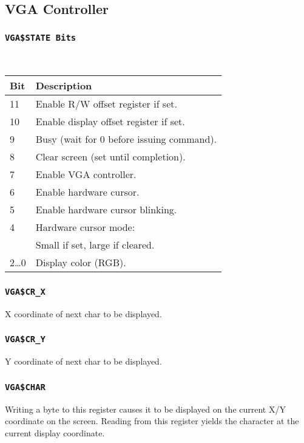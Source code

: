 \documentclass{leaflet}
\begin{document}
  \subsection{VGA Controller}
   \subsubsection{\texttt{VGA\$STATE Bits}}
~
\vspace*{-4mm}
    \begin{center}
     \begin{longtable}{|l|l|}
      \hline
      Bit&Description\\
      \hline
      \hline
      11&Enable R/W offset register if set.\\
      10&Enable display offset register if set.\\
      9&Busy (wait for 0 before issuing command).\\
      8&Clear screen (set until completion).\\
      7&Enable VGA controller.\\
      6&Enable hardware cursor.\\
      5&Enable hardware cursor blinking.\\
      4&Hardware cursor mode:\\
       &Small if set, large if cleared.\\
      2\dots 0&Display color (RGB).\\
      \hline
     \end{longtable}
    \end{center}
\vspace*{-15mm}
   \subsubsection{\texttt{VGA\$CR\_X}}
    X coordinate of next char to be displayed.
\vspace*{-8mm}
   \subsubsection{\texttt{VGA\$CR\_Y}}
    Y coordinate of next char to be displayed.
\vspace*{-8mm}
   \subsubsection{\texttt{VGA\$CHAR}}
    Writing a byte to this register causes it to be displayed on the current
    X/Y coordinate on the screen. Reading from this register yields the 
    character at the current display coordinate.
\vspace*{-5mm}
\end{document}
